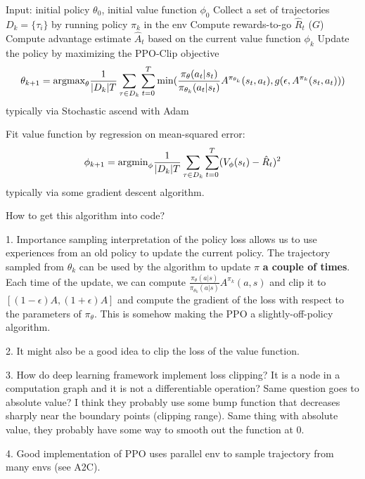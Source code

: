 \documentclass{article}
\begin{document}
\begin{algorithmic}[1]
\STATE Input: initial policy $\theta_0$, initial value function $\phi_0$
\STATE Collect a set of trajectories $D_k = \{\tau_i\}$ by running policy
$\pi_k$ in the env
\STATE Compute rewards-to-go $\hat R_t$ ($G$)
\STATE Compute advantage estimate $\hat A_t$ based on the current
value function $\phi_k$
\STATE Update the policy by maximizing the PPO-Clip objective
\[
\theta_{k+1} = \text{argmax}_{\theta} \frac{1}{|D_k|T}
\sum_{\tau \in D_k}\sum_{t=0}^T \min(
\frac{\pi_{\theta}(a_t | s_t)}{\pi_{\theta_k}(a_t|s_t)}
A^{\pi_{\theta_k}}(s_t, a_t), g(\epsilon, A^{\pi_k}(s_t, a_t)))
\]
typically via Stochastic ascend with Adam

\STATE Fit value function by regression on mean-squared error:
\[
\phi_{k+1} = \text{argmin}_{\phi}\frac{1}{|D_k|T}
\sum_{\tau \in D_k}\sum_{t=0}^T(V_{\phi}(s_t) - \hat R_t)^2
\]
typically via some gradient descent algorithm. 
\ENDFOR
\end{algorithmic}

How to get this algorithm into code?

1. Importance sampling interpretation of the policy loss allows us to use experiences 
from an old policy to update the current policy. The trajectory sampled from
$\theta_k$ can be used by the algorithm to update $\pi$ \textbf{a couple of times}. 
Each time of the update, we can compute 
$\frac{\pi_{\theta}(a|s)}{\pi_{\theta_k}(a|s)}A^{\pi_k}(a, s)$ and clip it to 
$[(1-\epsilon)A, (1 + \epsilon)A]$ and compute the gradient of the loss with 
respect to the parameters of $\pi_{\theta}$. This is somehow making the PPO a 
slightly-off-policy algorithm.

2. It might also be a good idea to clip the loss of the value function. 

3. How do deep learning framework implement loss clipping? It is a node 
in a computation graph and it is not a differentiable operation? Same 
question goes to absolute value? I think they probably use some bump
function that decreases sharply near the boundary points (clipping range).
Same thing with absolute value, they probably have some way to smooth
out the function at 0.

4. Good implementation of PPO uses parallel env to sample trajectory 
from many envs (see A2C). 
\end{document}

